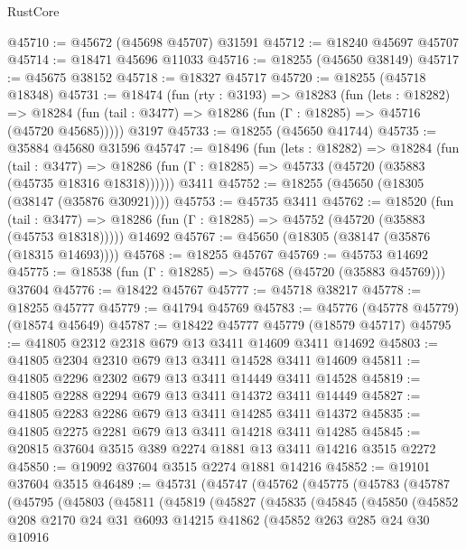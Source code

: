 \begin{lexlean}{RustCore}
\begin{coremodule}
@45710 := @45672 (@45698 @45707) @31591
@45712 := @18240 @45697 @45707
@45714 := @18471 @45696 @11033
@45716 := @18255 (@45650 @38149)
@45717 := @45675 @38152
@45718 := @18327 @45717
@45720 := @18255 (@45718 @18348)
@45731 := @18474
    (fun (rty : @3193) =>
    @18283
      (fun (lets : @18282) =>
      @18284 (fun (tail : @3477) => @18286 (fun (Γ : @18285) => @45716 (@45720 @45685)))))
    @3197
@45733 := @18255 (@45650 @41744)
@45735 := @35884 @45680 @31596
@45747 := @18496
    (fun (lets : @18282) =>
    @18284
      (fun (tail : @3477) =>
      @18286 (fun (Γ : @18285) => @45733 (@45720 (@35883 (@45735 @18316 @18318))))))
    @3411
@45752 := @18255 (@45650 (@18305 (@38147 (@35876 @30921))))
@45753 := @45735 @3411
@45762 := @18520
    (fun (tail : @3477) => @18286 (fun (Γ : @18285) => @45752 (@45720 (@35883 (@45753 @18318)))))
    @14692
@45767 := @45650 (@18305 (@38147 (@35876 (@18315 @14693))))
@45768 := @18255 @45767
@45769 := @45753 @14692
@45775 := @18538 (fun (Γ : @18285) => @45768 (@45720 (@35883 @45769))) @37604
@45776 := @18422 @45767
@45777 := @45718 @38217
@45778 := @18255 @45777
@45779 := @41794 @45769
@45783 := @45776 (@45778 @45779) (@18574 @45649)
@45787 := @18422 @45777 @45779 (@18579 @45717)
@45795 := @41805 @2312 @2318 @679 @13 @3411 @14609 @3411 @14692
@45803 := @41805 @2304 @2310 @679 @13 @3411 @14528 @3411 @14609
@45811 := @41805 @2296 @2302 @679 @13 @3411 @14449 @3411 @14528
@45819 := @41805 @2288 @2294 @679 @13 @3411 @14372 @3411 @14449
@45827 := @41805 @2283 @2286 @679 @13 @3411 @14285 @3411 @14372
@45835 := @41805 @2275 @2281 @679 @13 @3411 @14218 @3411 @14285
@45845 := @20815 @37604 @3515 @389 @2274 @1881 @13 @3411 @14216 @3515 @2272
@45850 := @19092 @37604 @3515 @2274 @1881 @14216
@45852 := @19101 @37604 @3515
@46489 := @45731
    (@45747
      (@45762
        (@45775
          (@45783
            (@45787
              (@45795
                (@45803
                  (@45811
                    (@45819
                      (@45827
                        (@45835
                          (@45845
                            (@45850
                              (@45852
                                @208
                                @2170
                                @24
                                @31
                                @6093
                                @14215
                                @41862
                                (@45852
                                  @263
                                  @285
                                  @24
                                  @30
                                  @10916

\end{coremodule}
\end{lexlean}

